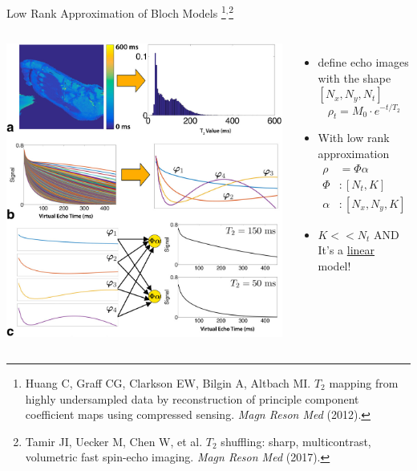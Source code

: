 \documentclass[aspectratio=169]{beamer}
\begin{document}
	\begin{frame}{Low Rank Approximation of Bloch Models \footnote{Huang C, Graff CG, Clarkson EW, Bilgin A, Altbach MI. $T_2$ mapping from highly undersampled data by reconstruction of principle component coefficient maps using compressed sensing. \textit{Magn Reson Med} (2012).}$^,$\footnote{Tamir JI, Uecker M, Chen W, et al. $T_2$ shuffling: sharp, multicontrast, volumetric fast spin-echo imaging. \textit{Magn Reson Med} (2017).}}
		\begin{columns}
			\centering
			\includegraphics[height=0.75\textheight]{figures/mrm26102-fig-0004-m.jpg}
			
			\centering
			\begin{itemize}
				\item <1-> define echo images with the shape $[N_x, N_y, N_t]$
				\begin{equation}
					\rho_t = M_0 \cdot e^{-t / T_2}
				\end{equation}
				
				\item <2-> With low rank approximation
				\begin{align}
					\rho &= \Phi \alpha \\
					\Phi &: [N_t, K] \\
					\alpha &: [N_x, N_y, K]
				\end{align}
				
				\item <3-> $K << N_t$ AND It's a \underline{linear} model!
			\end{itemize}
		\end{columns}
	\end{frame}
	
\end{document}
